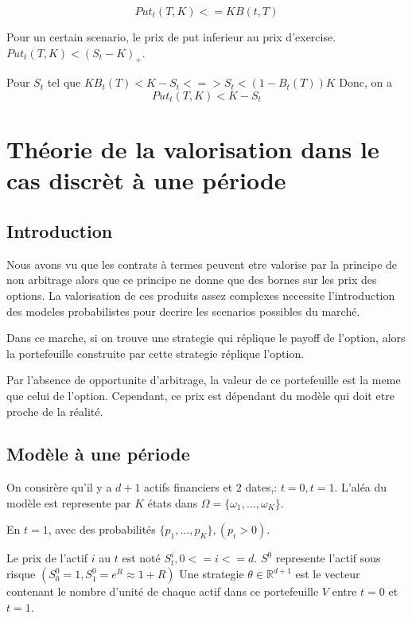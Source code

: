 \documentclass{article}
\begin{document}
\begin{equation}
Put_t(T, K) <= KB(t, T)
\end{equation}

Pour un certain scenario, le prix de put inferieur au prix d'exercise. $Put_t(T, K)<(S_t-K)_+$.

Pour $S_t$ tel que $KB_t(T)< K-S_t <=> S_t < (1-B_t(T))K$
Donc, on a
\begin{equation}
Put_t(T, K)< K-S_t
\end{equation} 

\section{Th\'eorie de la valorisation dans le cas discr\`et \`a une p\'eriode}

\subsection{Introduction}
Nous avons vu que les contrats \`a termes peuvent etre valorise par la principe de non arbitrage alors que ce principe ne donne que des bornes sur les prix des options. La valorisation de ces produits assez complexes necessite l'introduction des modeles probabilistes pour decrire les scenarios possibles du march\'e.

Dans ce marche, si on trouve une strategie qui r\'eplique le payoff de l'option, alors la portefeuille construite par cette strategie r\'eplique l'option.

Par l'absence de opportunite d'arbitrage, la valeur de ce portefeuille est la meme que celui de l'option. Cependant, ce prix est d\'ependant du mod\`ele qui doit etre proche de la r\'ealit\'e.

\subsection{Mod\`ele \`a une p\'eriode}

On consir\`ere qu'il y a $d+1$ actifs financiers et $2$ dates,: $t=0, t=1$. L'al\'ea du mod\`ele est represente par $K$ \'etats dans $\Omega=\{\omega_1,\ldots,\omega_K\}$.

En $t=1$, avec des probabilit\'es $ \{p_1,\ldots,p_K\},(p_i>0) $.

Le prix de l'actif $i$ au $t$ est not\'e $S_t^i, 0<=i<=d$. $S^0$ represente l'actif sous risque $(S_0^0=1, S_1^0=e^R\approx 1+R)$
Une strategie $\theta\in\mathbb{R}^{d+1}$ est le vecteur contenant le nombre d'unit\'e de chaque actif dans ce portefeuille $V$ entre $t=0$ et $t=1$. 
\end{document}
